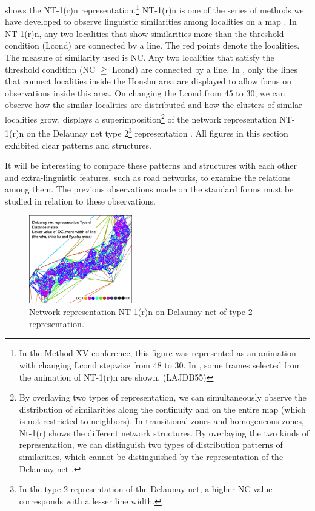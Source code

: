 \documentclass[output=paper]{LSP/langsci}
\begin{document}
 shows the NT-1(r)n representation.\footnote{ In the Method XV conference, this figure was represented as an animation with changing Lcond stepwise from 48 to 30. In , some frames selected from the animation of NT-1(r)n are shown. (LAJDB55)} NT-1(r)n is one of the series of methods we have developed to observe linguistic similarities among localities on a map \citep[2]{Kumagai2013c}. In NT-1(r)n, any two localities that show similarities more than the threshold condition (Lcond) are connected by a line. The red points denote the localities. The measure of similarity used is NC. Any two localities that satisfy the threshold condition (NC \textsf{${\geqq}$ }Lcond) are connected by a line. In , only the lines that connect localities inside the Honshu area are displayed to allow focus on observations inside this area. On changing the Lcond from 45 to 30, we can observe how the similar localities are distributed and how the clusters of similar localities grow.  displays a superimposition\footnote{By overlaying two types of representation, we can simultaneously observe the distribution of similarities along the continuity and on the entire map (which is not restricted to neighbors). In transitional zones and homogeneous zones, Nt-1(r) shows the different network structures. By overlaying the two kinds of representation, we can distinguish two types of distribution patterns of similarities, which cannot be distinguished by the representation of the Delaunay net \citep[7]{Kumagai2013c}.} of the network representation NT-1(r)n on the Delaunay net type 2\footnote{ In the type 2 representation of the Delaunay net, a higher NC value corresponds with a lesser line width.} representation \citep[6--7]{kumagai_development_2013}. All figures in this section exhibited clear patterns and structures. 

It will be interesting to compare these patterns and structures with each other and extra-linguistic features, such as road networks, to examine the relations among them. The previous observations made on the standard forms must be studied in relation to these observations. 

\begin{figure}
\includegraphics[width=0.4\textwidth]{illustrations/kuma_fig23}
\caption{Network representation NT-1(r)n on Delaunay net of type 2 representation.}
\label{fig:25}
\end{figure}  
\end{document}
